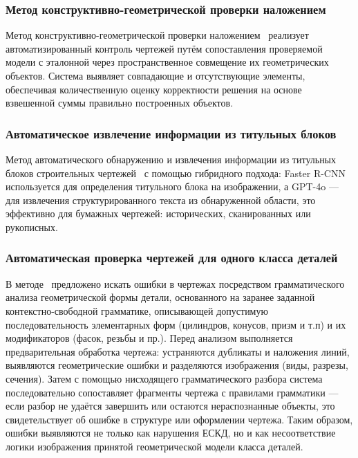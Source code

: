 \subsubsection{Метод конструктивно-геометрической проверки наложением}

Метод конструктивно-геометрической проверки наложением~\cite{boikov2016} реализует автоматизированный контроль чертежей
путём сопоставления проверяемой модели с эталонной через пространственное совмещение их геометрических объектов.
Система выявляет совпадающие и отсутствующие элементы, обеспечивая количественную оценку корректности решения
на основе взвешенной суммы правильно построенных объектов.

\subsubsection{Автоматическое извлечение информации из титульных блоков}

Метод автоматического обнаружению и извлечения информации из титульных блоков строительных чертежей~\cite{duan2024automatic}
с помощью гибридного подхода: Faster R-CNN используется для определения титульного блока на изображении,
а GPT-4o --- для извлечения структурированного текста из обнаруженной области,
это эффективно для бумажных чертежей: исторических, сканированных или рукописных.

\subsubsection{Автоматическая проверка чертежей для одного класса деталей}

В методе~\cite{boikov2020} предложено искать ошибки в чертежах посредством грамматического анализа геометрической формы детали,
основанного на заранее заданной контекстно-свободной грамматике,
описывающей допустимую последовательность элементарных форм (цилиндров, конусов, призм и т.п) и их модификаторов (фасок, резьбы и пр.).
Перед анализом выполняется предварительная обработка чертежа: устраняются дубликаты и наложения линий, выявляются геометрические ошибки
и разделяются изображения (виды, разрезы, сечения).
Затем с помощью нисходящего грамматического разбора система последовательно сопоставляет фрагменты чертежа с правилами грамматики ---
если разбор не удаётся завершить или остаются нераспознанные объекты,
это свидетельствует об ошибке в структуре или оформлении чертежа.
Таким образом, ошибки выявляются не только как нарушения ЕСКД,
но и как несоответствие логики изображения принятой геометрической модели класса деталей.

